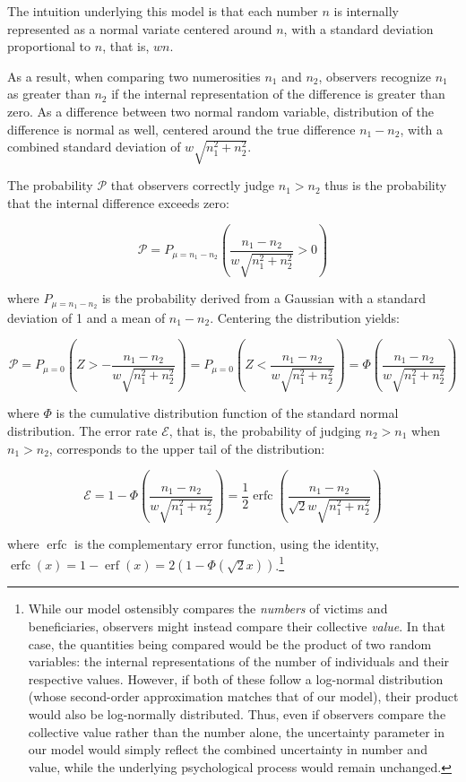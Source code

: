 \documentclass[
]{article}
\begin{document}
The intuition underlying this model is that each number \(n\) is internally represented as a normal variate centered around \(n\), with a standard deviation proportional to \(n\), that is, \(w n\).

As a result, when comparing two numerosities \(n_1\) and \(n_2\), observers recognize \(n_1\) as greater than \(n_2\) if the internal representation of the difference is greater than zero. As a difference between two normal random variable, distribution of the difference is normal as well, centered around the true difference \(n_1 - n_2\), with a combined standard deviation of \(w \sqrt{n_1^2 + n_2^2}\).

The probability \(\mathcal{P}\) that observers correctly judge \(n_1 > n_2\) thus is the probability that the internal difference exceeds zero:

\[\mathcal{P} = P_{\mu = n_1 - n_2}\left(\frac{n_1 - n_2}{w \sqrt{n_1^2 + n_2^2}} > 0\right)\]

where \(P_{\mu = n_1 - n_2}\) is the probability derived from a Gaussian with a standard deviation of 1 and a mean of \(n_1 - n_2\). Centering the distribution yields:

\[\mathcal{P} = P_{\mu = 0}\left(Z > -\frac{n_1 - n_2}{w \sqrt{n_1^2 + n_2^2}}\right)
= P_{\mu = 0}\left(Z < \frac{n_1 - n_2}{w \sqrt{n_1^2 + n_2^2}}\right)
= \Phi\left( \frac{n_1 - n_2}{w \sqrt{n_1^2 + n_2^2}} \right)\]

where \(\Phi\) is the cumulative distribution function of the standard normal distribution. The error rate \(\mathcal{E}\), that is, the probability of judging \(n_2 > n_1\) when \(n_1 > n_2\), corresponds to the upper tail of the distribution:

\[\mathcal{E}
= 1 - \Phi\left( \frac{n_1 - n_2}{w \sqrt{n_1^2 + n_2^2}} \right)
= \frac{1}{2} \operatorname{erfc}\left( \frac{n_1 - n_2}{\sqrt{2} w \sqrt{n_1^2 + n_2^2}} \right)\]

where \(\operatorname{erfc}\) is the complementary error function, using the identity, \(\operatorname{erfc}\left(x\right) = 1 - \operatorname{erf}\left(x\right) = 2 \left( 1 - \Phi\left( \sqrt{2}x \right) \right)\).\footnote{While our model ostensibly compares the \emph{numbers} of victims and beneficiaries, observers might instead compare their collective \emph{value}. In that case, the quantities being compared would be the product of two random variables: the internal representations of the number of individuals and their respective values. However, if both of these follow a log-normal distribution (whose second-order approximation matches that of our model), their product would also be log-normally distributed. Thus, even if observers compare the collective value rather than the number alone, the uncertainty parameter in our model would simply reflect the combined uncertainty in number and value, while the underlying psychological process would remain unchanged.}
\end{document}
